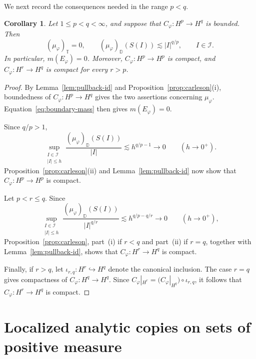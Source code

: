 \documentclass[10pt,a4paper]{amsart}
\newtheorem{corollary}[theorem]{Corollary}
\newcommand{\D}{\mathbb{D}}
\newcommand{\T}{\mathbb{T}}
\begin{document}
We next record the consequences needed in the range \(p<q\).

  
\begin{corollary}
\label{cor:boundary-obstruction}
Let \(1\le p<q<\infty\), and suppose that
\(C_\varphi:H^p\to H^q\) is bounded. Then
\[
        (\mu_\varphi)_{\T}=0,
        \qquad
        (\mu_\varphi)_{\D}(S(I))
        \lesssim |I|^{q/p},
        \qquad I\in\mathcal I.
\]
In particular, \(m(E_\varphi)=0\). Moreover,
\(C_\varphi:H^p\to H^p\) is compact, and
\(C_\varphi:H^r\to H^q\) is compact for every \(r>p\).
\end{corollary}

\begin{proof}
By Lemma~\ref{lem:pullback-id} and
Proposition~\ref{prop:carleson}\textup{(i)}, boundedness of
\(C_\varphi:H^p\to H^q\) gives the two assertions concerning
\(\mu_\varphi\). Equation~\eqref{eq:boundary-mass} then
gives \(m(E_\varphi)=0\).

Since \(q/p>1\),
\[
        \sup_{\substack{I\in\mathcal I\\ |I|\le h}}
        \frac{(\mu_\varphi)_{\D}(S(I))}{|I|}
        \lesssim
        h^{q/p-1}
        \longrightarrow0
        \qquad (h\to0^+).
\]
Proposition~\ref{prop:carleson}\textup{(ii)} and
Lemma~\ref{lem:pullback-id} now show that
\(C_\varphi:H^p\to H^p\) is compact.

Let \(p<r\le q\). Since
\[
        \sup_{\substack{I\in\mathcal I\\ |I|\le h}}
        \frac{(\mu_\varphi)_{\D}(S(I))}{|I|^{q/r}}
        \lesssim
        h^{q/p-q/r}
        \longrightarrow0
        \qquad (h\to0^+),
\]
Proposition~\ref{prop:carleson}, part~\textup{(i)} if
\(r<q\) and part~\textup{(ii)} if \(r=q\), together with
Lemma~\ref{lem:pullback-id}, shows that
\(C_\varphi:H^r\to H^q\) is compact.

Finally, if \(r>q\), let
\(\iota_{r,q}:H^r\hookrightarrow H^q\) denote the canonical inclusion.
The case \(r=q\) gives compactness of
\(C_\varphi:H^q\to H^q\). Since
\(C_\varphi|_{H^r}
=
\bigl(C_\varphi|_{H^q}\bigr)\circ\iota_{r,q}\),
it follows that \(C_\varphi:H^r\to H^q\) is compact.
\end{proof}

\section{Localized analytic copies on sets of positive measure}
\label{sec:localization}
\end{document}
